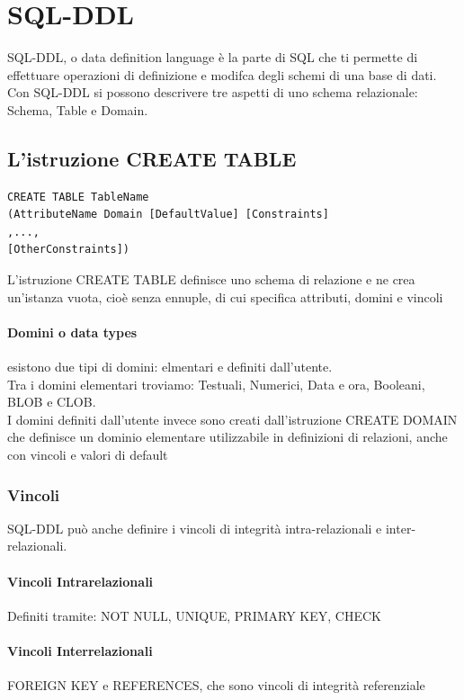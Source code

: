 \documentclass[12pt, a4paper, openany]{book}
\begin{document}
\section{SQL-DDL}
SQL-DDL, o data definition language è la parte di SQL che ti permette di effettuare operazioni di definizione e modifca degli schemi di una base di dati.
Con SQL-DDL si possono descrivere tre aspetti di uno schema relazionale: Schema, Table e Domain.
\subsection{L'istruzione CREATE TABLE}
\begin{lstlisting}
CREATE TABLE TableName
(AttributeName Domain [DefaultValue] [Constraints]
,...,
[OtherConstraints])
\end{lstlisting}
L'istruzione CREATE TABLE definisce uno schema di relazione e ne crea un'istanza vuota, cioè senza ennuple, di cui specifica attributi, domini e vincoli

\paragraph{Domini o data types}
esistono due tipi di domini: elmentari e definiti dall'utente.
\\Tra i domini elementari troviamo: Testuali, Numerici, Data e ora, Booleani, BLOB e CLOB.
\\I domini definiti dall'utente invece sono creati dall'istruzione CREATE DOMAIN che definisce un dominio elementare utilizzabile in definizioni di relazioni, anche con vincoli e valori di default
\subsubsection{Vincoli}
SQL-DDL può anche definire i vincoli di integrità intra-relazionali e inter-relazionali.
\paragraph{Vincoli Intrarelazionali} 
Definiti tramite: NOT NULL, UNIQUE, PRIMARY KEY, CHECK

\paragraph{Vincoli Interrelazionali} FOREIGN KEY e REFERENCES, che sono vincoli di integrità referenziale
\end{document}
